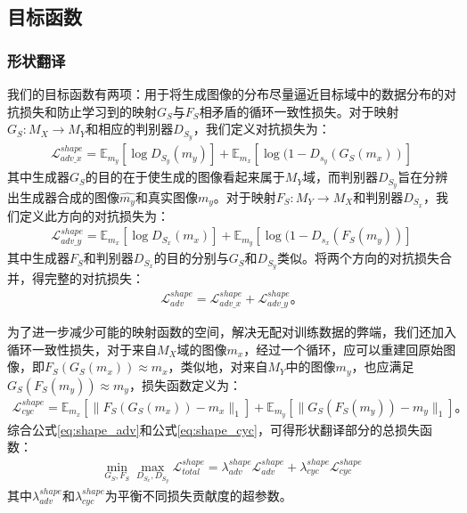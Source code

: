 \subsection{目标函数}

\subsubsection{形状翻译}

我们的目标函数有两项：用于将生成图像的分布尽量逼近目标域中的数据分布的对抗损失\cite{goodfellow2014generative}和防止学习到的映射$G_S$与$F_S$相矛盾的循环一致性损失\cite{zhu2017unpaired}。对于映射$G_S: M_X\to M_Y$和相应的判别器$D_{S_y}$，我们定义对抗损失为：
\begin{equation}
\begin{split}
\mathcal{L}_{adv\_x}^{shape}=\mathbb{E}_{m_y}[\log D_{S_y}(m_y)] + \mathbb{E}_{m_x}[\log(1-D_{s_y}(G_S(m_x))]
\end{split}
\label{eq:shape_x}
\end{equation}
其中生成器$G_S$的目的在于使生成的图像看起来属于$M_Y$域，而判别器$D_{S_y}$旨在分辨出生成器合成的图像$\hat{m_y}$和真实图像$m_y$。对于映射$F_S: M_Y\to M_X$和判别器$D_{S_x}$，我们定义此方向的对抗损失为：
\begin{equation}
\begin{split}
\mathcal{L}_{adv\_y}^{shape}=\mathbb{E}_{m_x}[\log D_{S_x}(m_x)] + \mathbb{E}_{m_y}[\log(1-D_{s_x}(F_S(m_y))]
\end{split}
\label{eq:shape_y}
\end{equation}
其中生成器$F_S$和判别器$D_{S_x}$的目的分别与$G_S$和$D_{S_y}$类似。将两个方向的对抗损失合并，得完整的对抗损失：
\begin{equation}
\begin{split}
\mathcal{L}_{adv}^{shape}=\mathcal{L}_{adv\_x}^{shape}+\mathcal{L}_{adv\_y}^{shape}。
\end{split}
\label{eq:shape_adv}
\end{equation}

为了进一步减少可能的映射函数的空间，解决无配对训练数据的弊端，我们还加入循环一致性损失，对于来自$M_X$域的图像$m_x$，经过一个循环，应可以重建回原始图像，即$F_S(G_S(m_x))\approx m_x$，类似地，对来自$M_Y$中的图像$m_y$，也应满足$G_S(F_S(m_y))\approx m_y$，损失函数定义为：
\begin{equation}
\begin{split}
\mathcal{L}_{cyc}^{shape}=\mathbb{E}_{m_x}[\parallel F_S(G_S(m_x))-m_x\parallel_1]+\mathbb{E}_{m_y}[\parallel G_S(F_S(m_y))-m_y\parallel_1]。
\end{split}
\label{eq:shape_cyc}
\end{equation}
综合公式\ref{eq:shape_adv}和公式\ref{eq:shape_cyc}，可得形状翻译部分的总损失函数：
\begin{equation}
\begin{split}
\min \limits_{G_S, F_S} \max \limits_{D_{S_x}, D_{S_y}} \mathcal{L}_{total}^{shape}=\lambda_{adv}^{shape}\mathcal{L}_{adv}^{shape}+\lambda_{cyc}^{shape}\mathcal{L}_{cyc}^{shape}
\end{split}
\label{eq:shape}
\end{equation}
其中$\lambda_{adv}^{shape}$和$\lambda_{cyc}^{shape}$为平衡不同损失贡献度的超参数。

